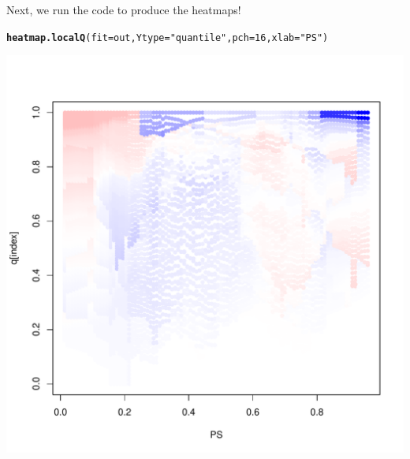 \documentclass{article}\usepackage[]{graphicx}\usepackage[]{color}
\makeatletter
\def\maxwidth{ %
  \ifdim\Gin@nat@width>\linewidth
    \linewidth
  \else
    \Gin@nat@width
  \fi
}
\newcommand{\hlnum}[1]{\textcolor[rgb]{0.686,0.059,0.569}{#1}}%
\newcommand{\hlstr}[1]{\textcolor[rgb]{0.192,0.494,0.8}{#1}}%
\newcommand{\hlstd}[1]{\textcolor[rgb]{0.345,0.345,0.345}{#1}}%
\newcommand{\hlkwc}[1]{\textcolor[rgb]{0.333,0.667,0.333}{#1}}%
\newcommand{\hlkwd}[1]{\textcolor[rgb]{0.737,0.353,0.396}{\textbf{#1}}}%
\newenvironment{kframe}{%
 \def\at@end@of@kframe{}%
 \ifinner\ifhmode%
  \def\at@end@of@kframe{\end{minipage}}%
  \begin{minipage}{\columnwidth}%
 \fi\fi%
 \def\FrameCommand##1{\hskip\@totalleftmargin \hskip-\fboxsep
 \colorbox{shadecolor}{##1}\hskip-\fboxsep
     \hskip-\linewidth \hskip-\@totalleftmargin \hskip\columnwidth}%
 \MakeFramed {\advance\hsize-\width
   \@totalleftmargin\z@ \linewidth\hsize
   \@setminipage}}%
 {\par\unskip\endMakeFramed%
 \at@end@of@kframe}
\newenvironment{knitrout}{}{} %
\makeatother
\begin{document}
Next, we run the code to produce the heatmaps!
\begin{knitrout}
\color{fgcolor}\begin{kframe}
\begin{alltt}
\hlkwd{heatmap.localQ}\hlstd{(}\hlkwc{fit}\hlstd{=out ,} \hlkwc{Ytype}\hlstd{=}\hlstr{"quantile"} \hlstd{,} \hlkwc{pch}\hlstd{=}\hlnum{16} \hlstd{,} \hlkwc{xlab}\hlstd{=}\hlstr{"PS"}\hlstd{)}
\end{alltt}
\end{kframe}

{\centering \includegraphics[width=\maxwidth]{figures/lalonde-heatmap-1} 

}



\end{knitrout}
\end{document}
